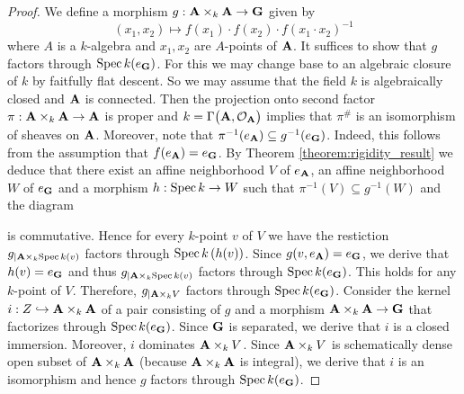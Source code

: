 \begin{proof}
We define a morphism $g:\mathbf{A}\times_k \mathbf{A}\rightarrow \mathbf{G}$ given by
$$(x_1,x_2) \mapsto f(x_1)\cdot f(x_2)\cdot f(x_1\cdot x_2)^{-1}$$
where $A$ is a $k$-algebra and $x_1,x_2$ are $A$-points of $\mathbf{A}$. It suffices to show that $g$ factors through $\mathrm{Spec}\, k(e_{\mathbf{G}})$. For this we may change base to an algebraic closure of $k$ by faitfully flat descent. So we may assume that the field $k$ is algebraically closed and $\mathbf{A}$ is connected. Then the projection onto second factor $\pi:\mathbf{A}\times_k \mathbf{A}\rightarrow \mathbf{A}$ is proper and $k = \Gamma\big(\mathbf{A},{\mathcal O}_{\mathbf{A}}\big)$ implies that $\pi^{\#}$ is an isomorphism of sheaves on $\mathbf{A}$. Moreover, note that $\pi^{-1}(e_{\mathbf{A}})\subseteq g^{-1}(e_{\mathbf{G}})$. Indeed, this follows from the assumption that $f(e_{\mathbf{A}}) = e_{\mathbf{G}}$. By Theorem \ref{theorem:rigidity_result} we deduce that there exist an affine neighborhood $V$ of $e_{\mathbf{A}}$, an affine neighborhood $W$ of $e_{\mathbf{G}}$ and a morphism $h:\mathrm{Spec}\, k\rightarrow W$ such that $\pi^{-1}(V) \subseteq g^{-1}(W)$ and the diagram
\begin{center}
\end{center}
is commutative. Hence for every $k$-point $v$ of $V$ we have the restiction $g_{\mid \mathbf{A} \times_k\mathrm{Spec}\, k(v)}$ factors through $\mathrm{Spec}\, k\left(h(v)\right)$. Since $g(v,e_{\mathbf{A}}) = e_{\mathbf{G}}$, we derive that $h(v) = e_{\mathbf{G}}$ and thus $g_{\mid \mathbf{A}\times_k\mathrm{Spec}\, k(v)}$ factors through $\mathrm{Spec}\, k(e_{\mathbf{G}})$. This holds for any $k$-point of $V$. Therefore, $g_{\mid \mathbf{A}\times_kV}$ factors through $\mathrm{Spec}\, k(e_{\mathbf{G}})$. Consider the kernel $i:Z\hookrightarrow \mathbf{A}\times_k\mathbf{A}$ of a pair consisting of $g$ and a morphism $\mathbf{A}\times_k\mathbf{A}\rightarrow \mathbf{G}$ that factorizes through $\mathrm{Spec}\, k(e_{\mathbf{G}})$. Since $\mathbf{G}$ is separated, we derive that $i$ is a closed immersion. Moreover, $i$ dominates $\mathbf{A}\times_kV$. Since $\mathbf{A}\times_kV$ is schematically dense open subset of $\mathbf{A}\times_k\mathbf{A}$ (because $\mathbf{A}\times_k\mathbf{A}$ is integral), we derive that $i$ is an isomorphism and hence $g$ factors through $\mathrm{Spec}\, k(e_{\mathbf{G}})$.
\end{proof}

